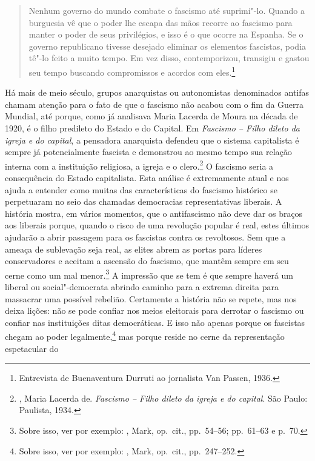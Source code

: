 \begin{quote}
Nenhum governo do mundo combate o fascismo até suprimi"-lo. Quando a
burguesia vê que o poder lhe escapa das mãos recorre ao fascismo para
manter o poder de seus privilégios, e isso é o que ocorre na Espanha. Se
o governo republicano tivesse desejado eliminar os elementos fascistas,
podia tê"-lo feito a muito tempo. Em vez disso, contemporizou,
transigiu e gastou seu tempo buscando compromissos e acordos com
eles.\footnote{Entrevista de Buenaventura Durruti ao jornalista Van
  Passen, 1936.}
\end{quote}

Há mais de meio século, grupos anarquistas ou autonomistas denominados
antifas chamam atenção para o fato de que o fascismo não acabou
com o fim da  Guerra Mundial, até porque, como já analisava Maria Lacerda
de Moura na década de 1920, é o filho predileto do Estado e do Capital. Em
\emph{Fascismo -- Filho dileto da igreja e do capital}, a pensadora
anarquista defendeu que o sistema capitalista é sempre já potencialmente
fascista e demonstrou ao mesmo tempo sua relação interna com a
instituição religiosa, a igreja e o clero.\footnote{, Maria Lacerda de.
  \emph{Fascismo -- Filho dileto da igreja e do capital}. São Paulo:
  Paulista, 1934.} O fascismo seria a consequência do Estado
capitalista. Esta análise é extremamente atual e nos ajuda a entender
como muitas das características do fascismo histórico se perpetuaram no
seio das chamadas democracias representativas liberais. A história
mostra, em vários momentos, que o antifascismo não deve dar os braços
aos liberais porque, quando o risco de uma revolução popular é real,
estes últimos ajudarão a abrir passagem para os fascistas contra os
revoltosos. Sem que a ameaça de sublevação seja real, as elites abrem as
portas para líderes conservadores e aceitam a ascensão do fascismo, que
mantêm sempre em seu cerne como um mal menor.\footnote{Sobre isso, ver
  por exemplo: , Mark, op.~cit., pp.~54--56; pp.~61--63 e p.~70.} A impressão que se tem é que sempre haverá um liberal
ou social"-democrata abrindo caminho para a extrema direita para
massacrar uma possível rebelião. Certamente a história não se repete,
mas nos deixa lições: não se pode confiar nos meios eleitorais para
derrotar o fascismo ou confiar nas instituições ditas democráticas. E
isso não apenas porque os fascistas chegam ao poder legalmente,\footnote{Sobre
  isso, ver por exemplo: , Mark, op.~cit., pp.~247--252.} mas porque reside no cerne da representação espetacular do

